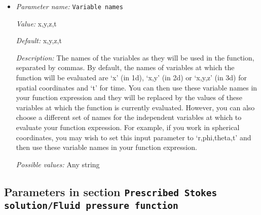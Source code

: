 \begin{itemize}
{\it Possible values:} Any string
\item {\it Parameter name:} {\tt Variable names}
\label{parameters:Prescribed Stokes solution/Compaction pressure function/Variable names}
\label{parameters:Prescribed_20Stokes_20solution/Compaction_20pressure_20function/Variable_20names}


{\it Value:} x,y,z,t


{\it Default:} x,y,z,t


{\it Description:} The names of the variables as they will be used in the function, separated by commas. By default, the names of variables at which the function will be evaluated are `x' (in 1d), `x,y' (in 2d) or `x,y,z' (in 3d) for spatial coordinates and `t' for time. You can then use these variable names in your function expression and they will be replaced by the values of these variables at which the function is currently evaluated. However, you can also choose a different set of names for the independent variables at which to evaluate your function expression. For example, if you work in spherical coordinates, you may wish to set this input parameter to `r,phi,theta,t' and then use these variable names in your function expression.


{\it Possible values:} Any string
\end{itemize}

\subsection{Parameters in section \tt Prescribed Stokes solution/Fluid pressure function}
\label{parameters:Prescribed_20Stokes_20solution/Fluid_20pressure_20function}

